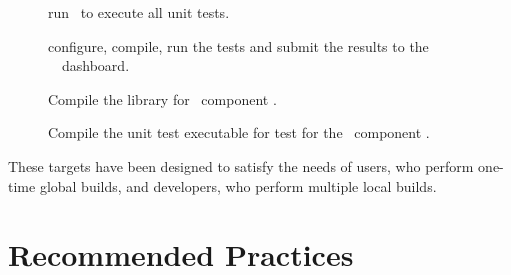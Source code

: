 \begin{description}
\item[] run \ctest\ to execute all unit tests.
\item[] configure, compile, run the tests and submit the results to the \draco\ \cdash\ dashboard.
\item[] Compile the library for \draco\ component .
\item[] Compile the unit test executable for test  for the \draco\ component .
\end{description}
These targets have been designed to satisfy the needs of users, who
perform one-time global builds, and developers, who perform multiple
local builds.


\section{Recommended Practices}

